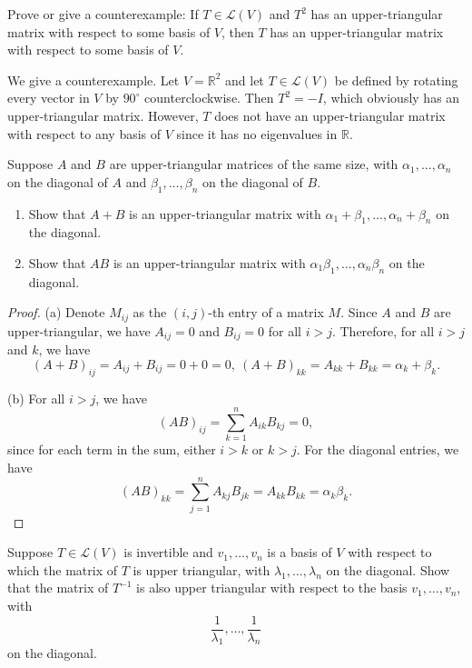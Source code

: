 \documentclass{article}
\begin{document}
\begin{problem}[5C-1]
Prove or give a counterexample: If $T \in \mathcal{L}(V)$ and $T^2$ has an upper-triangular matrix with respect to some basis of $V$, then $T$ has an upper-triangular matrix with respect to some basis of $V$.
\end{problem}

\begin{solution}
  We give a counterexample. Let $V = \mathbb{R}^2$ and let $T \in \mathcal{L}(V)$ be defined by rotating every vector in $V$ by $90^\circ$ counterclockwise. Then \( T^2=-I \), which obviously has an upper-triangular matrix. However, \( T \) does not have an upper-triangular matrix with respect to any basis of \( V \) since it has no eigenvalues in \( \mathbb{R} \).
\end{solution}



\begin{problem}[5C-2]
Suppose $A$ and $B$ are upper-triangular matrices of the same size, with $\alpha_1, \ldots, \alpha_n$ on the diagonal of $A$ and $\beta_1, \ldots, \beta_n$ on the diagonal of $B$.
\begin{enumerate}[label=(\alph*)]
\item Show that $A + B$ is an upper-triangular matrix with $\alpha_1 + \beta_1, \ldots, \alpha_n + \beta_n$ on the diagonal.
\item Show that $AB$ is an upper-triangular matrix with $\alpha_1\beta_1, \ldots, \alpha_n\beta_n$ on the diagonal.
\end{enumerate}
\end{problem}

\begin{proof}
  (a) Denote \( M_{ij} \) as the \( (i,j) \)-th entry of a matrix \( M \). Since \( A \) and \( B \) are upper-triangular, we have \( A_{ij} = 0 \) and \( B_{ij} = 0 \) for all \( i > j \). Therefore, for all \( i > j \) and \( k \), we have
  \[ (A + B)_{ij} = A_{ij} + B_{ij} = 0 + 0 = 0,\ (A+B)_{kk}=A_{kk}+B_{kk}=\alpha_k+\beta_k. \]\par
  (b) For all \( i > j \), we have
  \[ (AB)_{ij} = \sum_{k=1}^n A_{ik} B_{kj} = 0, \]
  since for each term in the sum, either \( i > k \) or \( k > j \). For the diagonal entries, we have
  \[ (AB)_{kk} = \sum_{j=1}^n A_{kj} B_{jk} = A_{kk} B_{kk} = \alpha_k \beta_k. \]
\end{proof}



\begin{problem}[5C-3]
Suppose $T \in \mathcal{L}(V)$ is invertible and $v_1, \ldots, v_n$ is a basis of $V$ with respect to which the matrix of $T$ is upper triangular, with $\lambda_1, \ldots, \lambda_n$ on the diagonal. Show that the matrix of $T^{-1}$ is also upper triangular with respect to the basis $v_1, \ldots, v_n$, with
\[
\frac{1}{\lambda_1}, \ldots, \frac{1}{\lambda_n}
\]
on the diagonal.
\end{problem}
\end{document}
